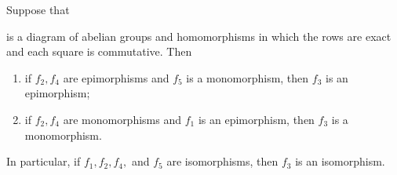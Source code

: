 \documentclass[12pt]{article}
\begin{document}
\begin{thm} \label{thm:fivelemma}
	Suppose that
	\begin{center}
	\end{center}
	is a diagram of abelian groups and homomorphisms in which the rows are exact and each square is commutative. Then
	\begin{enumerate}
		\item if $f_2, f_4$ are epimorphisms and $f_5$ is a monomorphism, then $f_3$ is an epimorphism;
		\item if $f_2, f_4$ are monomorphisms and $f_1$ is an epimorphism, then $f_3$ is a monomorphism.
	\end{enumerate}
	In particular, if $f_1, f_2, f_4,$ and $f_5$ are isomorphisms, then $f_3$ is an isomorphism.
\end{thm}
\end{document}
